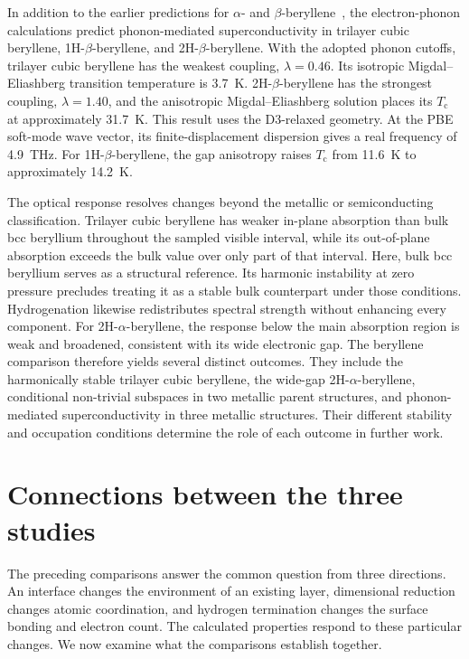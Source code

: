 In addition to the earlier predictions for $\alpha$- and $\beta$-beryllene~\cite{li2023coexistence}, the electron-phonon calculations predict phonon-mediated superconductivity in trilayer cubic beryllene, 1H-$\beta$-beryllene, and 2H-$\beta$-beryllene.
With the adopted phonon cutoffs, trilayer cubic beryllene has the weakest coupling, $\lambda=0.46$.
Its isotropic Migdal--Eliashberg transition temperature is \qty{3.7}{\kelvin}.
2H-$\beta$-beryllene has the strongest coupling, $\lambda=1.40$, and the anisotropic Migdal--Eliashberg solution places its $T_{\mathrm{c}}$ at approximately \qty{31.7}{\kelvin}.
This result uses the D3-relaxed geometry.
At the PBE soft-mode wave vector, its finite-displacement dispersion gives a real frequency of \qty{4.9}{\tera\hertz}.
For 1H-$\beta$-beryllene, the gap anisotropy raises $T_{\mathrm{c}}$ from \qty{11.6}{\kelvin} to approximately \qty{14.2}{\kelvin}.

The optical response resolves changes beyond the metallic or semiconducting classification.
Trilayer cubic beryllene has weaker in-plane absorption than bulk bcc beryllium throughout the sampled visible interval,
while its out-of-plane absorption exceeds the bulk value over only part of that interval.
Here, bulk bcc beryllium serves as a structural reference.
Its harmonic instability at zero pressure precludes treating it as a stable bulk counterpart under those conditions.
Hydrogenation likewise redistributes spectral strength without enhancing every component.
For 2H-$\alpha$-beryllene, the response below the main absorption region is weak and broadened, consistent with its wide electronic gap.
The beryllene comparison therefore yields several distinct outcomes.
They include the harmonically stable trilayer cubic beryllene, the wide-gap 2H-$\alpha$-beryllene, conditional non-trivial subspaces in two metallic parent structures, and phonon-mediated superconductivity in three metallic structures.
Their different stability and occupation conditions determine the role of each outcome in further work.

\FloatBarrier
\section{Connections between the three studies}
\label{sec:conclusions_connections}

The preceding comparisons answer the common question from three directions.
An interface changes the environment of an existing layer, dimensional reduction changes atomic coordination, and hydrogen termination changes the surface bonding and electron count.
The calculated properties respond to these particular changes.
We now examine what the comparisons establish together.

